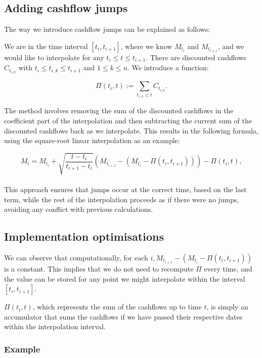 \documentclass{article}
\begin{document}
\subsection{Adding cashflow jumps}

The way we introduce cashflow jumps can be explained as follows:

We are in the time interval \( [t_i, t_{i+1}] \), where we know \( M_{t_i} \) and \( M_{t_{i+1}} \), and we would like to interpolate for any \( t_i \leq t \leq t_{i+1} \). There are discounted cashflows \( C_{t_{i, k}} \) with \( t_i \leq t_{i,k} \leq t_{i+1} \) and \( 1 \leq k \leq n \). We introduce a function:

\[
\Pi(t_i, t) := \sum_{t_{i, k} \leq t} C_{t_{i, k}}.
\]

The method involves removing the sum of the discounted cashflows in the coefficient part of the interpolation and then subtracting the current sum of the discounted cashflows back as we interpolate. This results in the following formula, using the square-root linear interpolation as an example:

\[
M_t = M_{t_i} + \sqrt{\frac{t - t_i}{t_{i+1} - t_i}} \left( M_{t_{i+1}} - \left( M_{t_i} - \Pi(t_i, t_{i+1}) \right) \right) - \Pi(t_i, t),
\]
\\
This approach ensures that jumps occur at the correct time, based on the last term, while the rest of the interpolation proceeds as if there were no jumps, avoiding any conflict with previous calculations.\\

\subsection*{Implementation optimisations}

We can observe that computationally, for each \(i, M_{t_{i+1}} - \left( M_{t_i} - \Pi(t_i, t_{i+1}) \right) \) is a constant. This implies that we do not need to recompute \( \Pi \) every time, and the value can be stored for any point we might interpolate within the interval \( [t_i, t_{i+1}] \).

\( \Pi(t_i, t) \), which represents the sum of the cashflows up to time \( t \), is simply an accumulator that sums the cashflows if we have passed their respective dates within the interpolation interval.




\subsubsection{Example}
\end{document}
